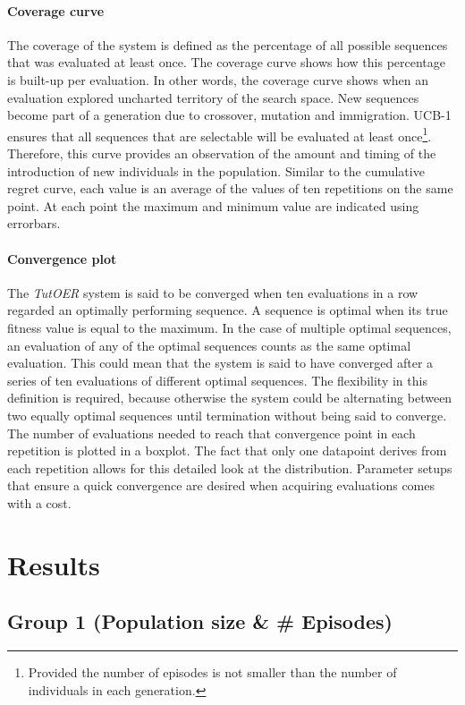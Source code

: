 \paragraph{Coverage curve}
The coverage of the system is defined as the percentage of all possible
sequences that was evaluated at least once. The coverage curve shows how this
percentage is built-up per evaluation. In other words, the coverage curve shows
when an evaluation explored uncharted territory of the search space. New
sequences become part of a generation due to crossover, mutation and
immigration. UCB-1 ensures that all sequences that are selectable will be
evaluated at least once\footnote{Provided the number of
episodes is not smaller than the number of individuals in each generation.}.
Therefore, this curve provides an observation of the amount and timing of the
introduction of new individuals in the population. Similar to the cumulative
regret curve, each value is an average of the values of ten repetitions on the
same point. At each point the maximum and minimum value are indicated using
errorbars.
\paragraph{Convergence plot}
The \emph{TutOER} system is said to be converged when ten evaluations in a row
regarded an optimally performing sequence. A sequence is optimal when its true
fitness value is equal to the maximum. In the case of multiple optimal
sequences, an evaluation of any of the optimal sequences counts as the same
optimal evaluation. This could mean that the system is said to have converged
after a series of ten evaluations of different optimal sequences. The
flexibility in this definition is required, because otherwise the system could
be alternating between two equally optimal sequences until termination without
being said to converge. The number of evaluations needed to reach that
convergence point in each repetition is plotted in a boxplot. The fact that
only one datapoint derives from each repetition allows for this detailed look
at the distribution. Parameter setups that ensure a quick convergence are
desired when acquiring evaluations comes with a cost.
\section{Results}
\label{sec:simulations_results}
\subsection{Group 1 (Population size \& \# Episodes)}
